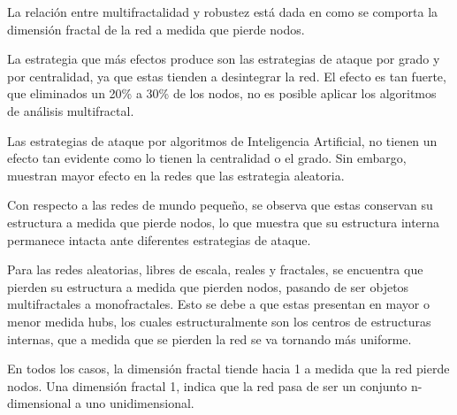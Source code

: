 La relación entre multifractalidad y robustez está dada en como se comporta la dimensión fractal de la red a medida que pierde nodos.

La estrategia que más efectos produce son las estrategias de ataque por grado y por centralidad, ya que estas tienden a desintegrar la red. El efecto es tan fuerte, que eliminados un 20\% a 30\% de los nodos, no es posible aplicar los algoritmos de análisis multifractal.

Las estrategias de ataque por algoritmos de Inteligencia Artificial, no tienen un efecto tan evidente como lo tienen la centralidad o el grado. Sin embargo, muestran mayor efecto en la redes que las estrategia aleatoria.

Con respecto a las redes de mundo pequeño, se observa que estas conservan su estructura a medida que pierde nodos, lo que muestra que su estructura interna permanece intacta ante diferentes estrategias de ataque.

Para las redes aleatorias, libres de escala, reales y fractales, se encuentra que pierden su estructura a medida que pierden nodos, pasando de ser objetos multifractales a monofractales. Esto se debe a que estas presentan en mayor o menor medida hubs, los cuales estructuralmente son los centros de estructuras internas, que a medida que se pierden la red se va tornando más uniforme.

En todos los casos, la dimensión fractal tiende hacia 1 a medida que la red pierde nodos. Una dimensión fractal 1, indica que la red pasa de ser un conjunto n-dimensional a uno unidimensional.